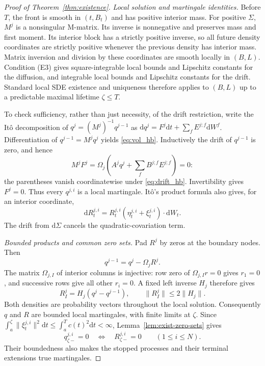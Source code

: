 \documentclass[11pt]{article}
\newcommand{\dd}{\mathrm d}
\theoremstyle{plain}
\theoremstyle{definition}
\theoremstyle{remark}
\begin{document}
\begin{proof}[Proof of Theorem~\ref{thm:existence}]
\emph{Local solution and martingale identities.}
Before $T$, the front is smooth in $(t,B_t)$ and has positive interior
mass. For positive $\Sigma$, $M^j$ is a nonsingular M-matrix. Its inverse
is nonnegative and preserves mass and first moment. Its interior block
has a strictly positive inverse, so all future density coordinates are
strictly positive whenever the previous density has interior mass.
Matrix inversion and division by these coordinates are smooth locally
in $(B,L)$. Condition (E3) gives square-integrable local bounds and
Lipschitz constants for the diffusion, and integrable local bounds and
Lipschitz constants for the drift. Standard local SDE existence and
uniqueness therefore applies to $(B,L)$ up to a predictable maximal
lifetime $\zeta\le T$.

To check sufficiency, rather than just necessity, of the drift restriction,
write the It\^o decomposition of $q^j=(M^j)^{-1}q^{j-1}$ as
$\dd q^j=F^j\dd t+\sum_f E^{j;f}\dd W^f$. Differentiation of
$q^{j-1}=M^jq^j$ yields \eqref{eq:vol_hb}. Inductively the drift of
$q^{j-1}$ is zero, and hence
\[
 M^jF^j=\Omega_j\left(A^jq^j+\sum_fB^{j;f}E^{j;f}\right)=0:
\]
the parentheses vanish coordinatewise under \eqref{eq:drift_hb}.
Invertibility gives $F^j=0$. Thus every $q^{j,i}$ is a local martingale.
It\^o's product formula also gives, for an interior coordinate,
\begin{equation}\label{eq:exist-R-sde}
 \dd R^{j,i}_t
   =R^{j,i}_t(\eta^{j,i}_t+\xi^{j,i}_t)\cdot\dd W_t.
\end{equation}
The drift from $\dd\Sigma$ cancels the quadratic-covariation term.

\emph{Bounded products and common zero sets.}
Pad $R^j$ by zeros at the boundary nodes. Then
\begin{equation}\label{eq:exist-R-identity}
 q^{j-1}=q^j-\Omega_jR^j.
\end{equation}
The matrix $\Omega_{j,I}$ of interior columns is injective: row zero of
$\Omega_{j,I}r=0$ gives $r_1=0$, and successive rows give all other
$r_i=0$. A fixed left inverse $H_j$ therefore gives
\[
 R_I^j=H_j(q^j-q^{j-1}),\qquad
 \lVert R_I^j\rVert\le2\lVert H_j\rVert.
\]
Both densities are probability vectors throughout the local solution.
Consequently $q$ and $R$ are bounded local martingales, with finite
limits at $\zeta$. Since $\int_a^\zeta\lVert\xi^{j,i}_t\rVert^2\dd t
\le\int_a^T c(t)^2\dd t<\infty$, Lemma~\ref{lem:exist-zero-sets} gives
\begin{equation}\label{eq:exist-zero-equivalence}
 q^{j,i}_{\zeta-}=0\quad\Longleftrightarrow\quad
 R^{j,i}_{\zeta-}=0\qquad(1\le i\le N).
\end{equation}
Their boundedness also makes the stopped processes and their terminal
extensions true martingales.


\end{proof}
\end{document}
